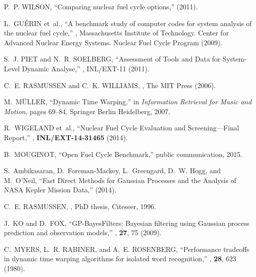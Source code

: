 \documentclass{ntmanuscript}
\begin{document}

\begin{thebibliography}{10}

P.~P. WILSON,
\newblock ``Comparing nuclear fuel cycle options,''
 (2011).

L.~GU{\'E}RIN et~al.,
\newblock ``A benchmark study of computer codes for system analysis of the
  nuclear fuel cycle,''
\newblock , Massachusetts Institute of Technology. Center for Advanced Nuclear
  Energy Systems. Nuclear Fuel Cycle Program (2009).

S.~J. PIET and N.~R. SOELBERG,
\newblock ``Assessment of Tools and Data for System-Level Dynamic Analyse,''
\newblock , INL/EXT-11 (2011).

C.~E. RASMUSSEN and C.~K. WILLIAMS,
,
\newblock The MIT Press (2006).

M.~M\"ULLER,
\newblock ``Dynamic Time Warping,''
\newblock in {\em Information Retrieval for Music and Motion}, pages 69--84,
  Springer Berlin Heidelberg, 2007.

R.~WIGELAND et~al.,
\newblock ``Nuclear Fuel Cycle Evaluation and Screening—Final Report,''
, {\bf INL/EXT-14-31465}
  (2014).

B.~MOUGINOT,
\newblock ``Open Fuel Cycle Benchmark,''
\newblock public communication, 2015.

S.~{Ambikasaran}, D.~{Foreman-Mackey}, L.~{Greengard}, D.~W. {Hogg}, and
  M.~{O'Neil},
\newblock ``{Fast Direct Methods for Gaussian Processes and the Analysis of
  NASA Kepler Mission Data},''
\newblock (2014).

C.~E. RASMUSSEN,
,
\newblock PhD thesis, Citeseer, 1996.

J.~KO and D.~FOX,
\newblock ``GP-BayesFilters: Bayesian filtering using Gaussian process
  prediction and observation models,''
, {\bf 27}, 75 (2009).

C.~MYERS, L.~R. RABINER, and A.~E. ROSENBERG,
\newblock ``Performance tradeoffs in dynamic time warping algorithms for
  isolated word recognition,''
,
  {\bf 28}, 623 (1980).


\end{thebibliography}
\end{document}
